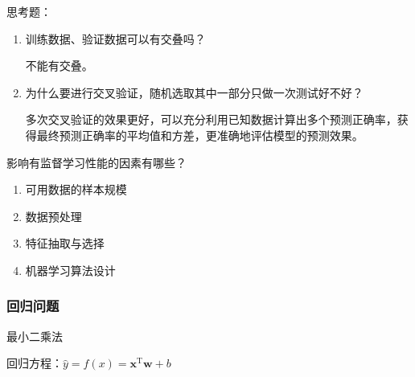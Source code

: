 \begin{example}
    思考题：
    \begin{enumerate}
        \item 训练数据、验证数据可以有交叠吗？
        
        不能有交叠。
        \item 为什么要进行交叉验证，随机选取其中一部分只做一次测试好不好？
        
        多次交叉验证的效果更好，可以充分利用已知数据计算出多个预测正确率，获得最终预测正确率的平均值和方差，更准确地评估模型的预测效果。
    \end{enumerate}
\end{example}
\begin{example}
    影响有监督学习性能的因素有哪些？
    \begin{enumerate}[A]
        \item \textcolor{main1}{可用数据的样本规模}
        \item \textcolor{main1}{数据预处理}
        \item \textcolor{main1}{特征抽取与选择}
        \item \textcolor{main1}{机器学习算法设计}
    \end{enumerate}
\end{example}
\subsubsection{回归问题}
\textcolor{main1}{最小二乘法}

回归方程：$\hat{y} = f(x) = \boldsymbol{x}^{\mathrm{T}}\boldsymbol{w} + b$

